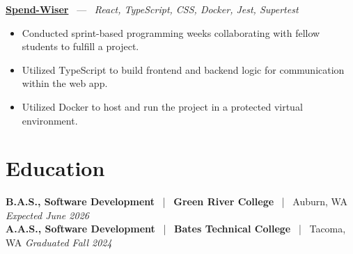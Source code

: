 \documentclass[10pt, letterpaper]{article}
\newcommand{\jobhead}[4]{%
  \vspace{5pt}%
  {\bfseries\color{dark}#1}%
  ~{\color{light}|}~%
  {\bfseries\color{navy}#2}%
  ~{\color{light}|}~%
  {\color{light}#3}%
  \hfill{\color{light}\small\textit{#4}}\\[-2pt]%
}
\newcommand{\projhead}[3]{%
  \vspace{5pt}%
  {\bfseries\color{dark}\href{#2}{#1}}%
  ~{\color{light}---}~%
  {\color{light}\small\textit{#3}}\\[-2pt]%
}
\begin{document}
\projhead{Spend-Wiser}{https://github.com/JesseChum/w26-sdev372-spendwiser-finance-tracker}{React, TypeScript, CSS, Docker, Jest, Supertest}
\begin{itemize}
  \item Conducted sprint-based programming weeks collaborating with fellow students to fulfill a project.
  \item Utilized TypeScript to build frontend and backend logic for communication within the web app.
  \item Utilized Docker to host and run the project in a protected virtual environment.
\end{itemize}

\section{Education}

\jobhead{B.A.S., Software Development}{Green River College}{Auburn, WA}{Expected June 2026}
\jobhead{A.A.S., Software Development}{Bates Technical College}{Tacoma, WA}{Graduated Fall 2024}
\end{document}
